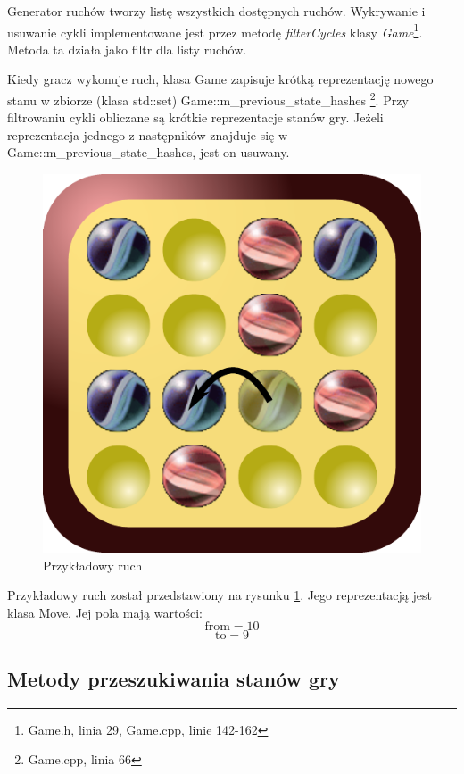 \documentclass{scrartcl}
\begin{document}
Generator ruchów tworzy listę wszystkich dostępnych ruchów. Wykrywanie
i usuwanie cykli implementowane jest przez metodę \emph{filterCycles}
klasy \emph{Game}\footnote{Game.h, linia 29, Game.cpp, linie 142-162}.
Metoda ta działa jako filtr dla listy ruchów. 

Kiedy gracz wykonuje ruch, klasa Game zapisuje krótką reprezentację
nowego stanu w zbiorze (klasa std::set) Game::m\_previous\_state\_hashes 
\footnote{Game.cpp, linia 66}.
Przy filtrowaniu cykli obliczane są krótkie reprezentacje stanów gry.
Jeżeli reprezentacja jednego z następników znajduje się w 
Game::m\_previous\_state\_hashes, jest on usuwany.

\begin{figure}[h]
  \centering
  \includegraphics[scale=0.6]{data/example_move.pdf}
  \caption{Przykładowy ruch}
  \label{fig:example_move}
\end{figure}

Przykładowy ruch został przedstawiony na rysunku
\ref{fig:example_move}. Jego reprezentacją jest klasa Move. Jej 
pola mają wartości:
\[\text{from} = 10\]
\[\text{to} = 9\]

\subsection{Metody przeszukiwania stanów gry}
\end{document}
